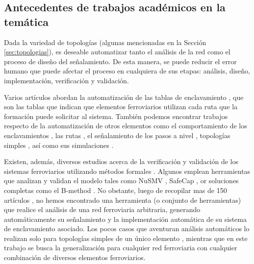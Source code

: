 \subsection{Antecedentes de trabajos académicos en la temática}
\label{sec:estudios}
    Dada la variedad de topologías (algunas mencionadas en la Sección \ref{sec:topologias}), es deseable automatizar tanto el análisis de la red como el proceso de diseño del señalamiento. De esta manera, se puede reducir el error humano que puede afectar el proceso en cualquiera de sus etapas: análisis, diseño, implementación, verificación y validación.

    Varios artículos abordan la automatización de las tablas de enclavamiento \cite{Paper_2,Paper_162,Paper_182,Paper_199}, que son las tablas que indican que elementos ferroviarios utilizan cada ruta que la formación puede solicitar al sistema. También podemos encontrar trabajos respecto de la automatización de otros elementos como el comportamiento de los enclavamientos \cite{Paper_21,Paper_99,Paper_198,Paper_158,Paper_197}, las rutas \cite{Paper_114}, el señalamiento de los pasos a nivel \cite{Paper_86}, topologías simples \cite{Paper_143,Paper_161}, así como sus simulaciones \cite{Paper_100,Paper_181}.

    Existen, además, diversos estudios acerca de la verificación y validación de los sistemas ferroviarios utilizando métodos formales \cite{Paper_184,Paper_144,Paper_87,Paper_186,Paper_187,Paper_188,Paper_89,Paper_141,Paper_161,Paper_164,Paper_165,Paper_171,Paper_189}. Algunos emplean herramientas que analizan y validan el modelo tales como NuSMV \cite{Paper_115,Paper_155,Paper_161,Paper_185}, SafeCap \cite{Paper_189,Paper_194,Paper_195}, or soluciones completas como el B-method \cite{Paper_190,Paper_191,Paper_192,Paper_193}. No obstante, luego de recopilar mas de 150 artículos \cite{BIBLIO}, no hemos encontrado una herramienta (o conjunto de herramientas) que realice el análisis de una red ferroviaria arbitraria, generando automáticamente su señalamiento y la implementación automática de su sistema de enclavamiento asociado. Los pocos casos que aventuran análisis automáticos lo realizan solo para topologías simples de un único elemento \cite{Paper_157,Paper_183}, mientras que en este trabajo se busca la generalización para cualquier red ferroviaria con cualquier combinación de diversos elementos ferroviarios.